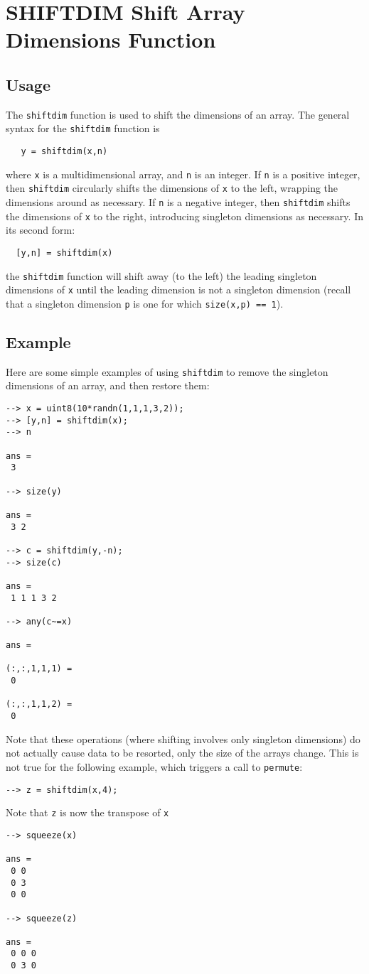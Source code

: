 \section{SHIFTDIM Shift Array Dimensions Function}

\subsection{Usage}

The \verb|shiftdim| function is used to shift the dimensions of an array.
The general syntax for the \verb|shiftdim| function is
\begin{verbatim}
   y = shiftdim(x,n)
\end{verbatim}
where \verb|x| is a multidimensional array, and \verb|n| is an integer.  If
\verb|n| is a positive integer, then \verb|shiftdim| circularly shifts the 
dimensions of \verb|x| to the left, wrapping the dimensions around as 
necessary.  If \verb|n| is a negative integer, then \verb|shiftdim| shifts
the dimensions of \verb|x| to the right, introducing singleton dimensions
as necessary.  In its second form:
\begin{verbatim}
  [y,n] = shiftdim(x)
\end{verbatim}
the \verb|shiftdim| function will shift away (to the left) the leading
singleton dimensions of \verb|x| until the leading dimension is not
 a singleton dimension (recall that a singleton dimension \verb|p| is one for
which \verb|size(x,p) == 1|).
\subsection{Example}

Here are some simple examples of using \verb|shiftdim| to remove the singleton
dimensions of an array, and then restore them:
\begin{verbatim}
--> x = uint8(10*randn(1,1,1,3,2));
--> [y,n] = shiftdim(x);
--> n

ans = 
 3 

--> size(y)

ans = 
 3 2 

--> c = shiftdim(y,-n);
--> size(c)

ans = 
 1 1 1 3 2 

--> any(c~=x)

ans = 

(:,:,1,1,1) = 
 0 

(:,:,1,1,2) = 
 0 
\end{verbatim}
Note that these operations (where shifting involves only singleton dimensions)
do not actually cause data to be resorted, only the size of the arrays change.
This is not true for the following example, which triggers a call to \verb|permute|:
\begin{verbatim}
--> z = shiftdim(x,4);
\end{verbatim}
 Note that \verb|z| is now the transpose of \verb|x|
\begin{verbatim}
--> squeeze(x)

ans = 
 0 0 
 0 3 
 0 0 

--> squeeze(z)

ans = 
 0 0 0 
 0 3 0 
\end{verbatim}
